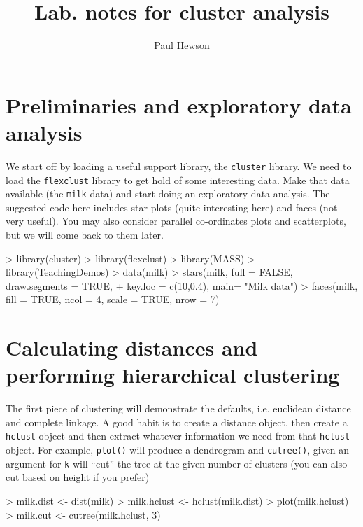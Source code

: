 \documentclass[11pt]{article}
\author{Paul Hewson}
\title{Lab. notes for cluster analysis}
\begin{document}
\maketitle




\section{Preliminaries and exploratory data analysis}

We start off by loading a useful support library, the \texttt{cluster} library.   We need to load the \texttt{flexclust} library to get hold of some interesting data.   Make that data available (the \texttt{milk} data) and start doing an exploratory data analysis.   The suggested code here includes star plots (quite interesting here) and faces (not very useful).   You may also consider parallel co-ordinates plots and scatterplots, but we will come back to them later.

\begin{Schunk}
\begin{Sinput}
> library(cluster)
> library(flexclust)
> library(MASS)
> library(TeachingDemos)
> data(milk)
> stars(milk, full = FALSE, draw.segments = TRUE, 
+     key.loc = c(10,0.4), main= "Milk data")
> faces(milk, fill = TRUE, ncol = 4, scale = TRUE, nrow = 7)
\end{Sinput}
\end{Schunk}


\section{Calculating distances and performing hierarchical clustering}

The first piece of clustering will demonstrate the defaults, i.e. euclidean distance and complete linkage.   A good habit is to create a distance object, then create a \texttt{hclust} object and then extract whatever information we need from that \texttt{hclust} object.   For example, \texttt{plot()} will produce a dendrogram and \texttt{cutree()}, given an argument for \texttt{k} will ``cut'' the tree at the given number of clusters (you can also cut based on height if you prefer)

\begin{Schunk}
\begin{Sinput}
> milk.dist <- dist(milk)
> milk.hclust <- hclust(milk.dist)
> plot(milk.hclust)
> milk.cut <- cutree(milk.hclust, 3)
\end{Sinput}
\end{Schunk}
\end{document}
